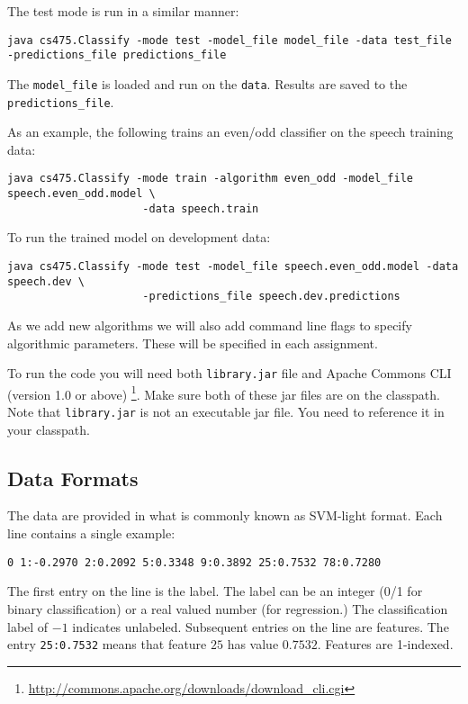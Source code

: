 \documentclass[11pt]{article}
\begin{document}
The test mode is run in a similar manner:
\begin{footnotesize}
\begin{verbatim}
java cs475.Classify -mode test -model_file model_file -data test_file -predictions_file predictions_file
\end{verbatim}
\end{footnotesize}
The {\tt model\_file} is loaded and run on the {\tt data}. Results are saved to the {\tt predictions\_file}.

As an example, the following trains an even/odd classifier on the speech training data:
\begin{footnotesize}
\begin{verbatim}
java cs475.Classify -mode train -algorithm even_odd -model_file speech.even_odd.model \
                     -data speech.train
\end{verbatim}
\end{footnotesize}
To run the trained model on development data:
\begin{footnotesize}
\begin{verbatim}
java cs475.Classify -mode test -model_file speech.even_odd.model -data speech.dev \
                     -predictions_file speech.dev.predictions
\end{verbatim}
\end{footnotesize}

As we add new algorithms we will also add command line flags to specify algorithmic parameters. These will be specified in each assignment.

To run the code you will need both {\tt library.jar} file and Apache Commons CLI (version 1.0 or above) \footnote{\href{http://commons.apache.org/downloads/download_cli.cgi}{http://commons.apache.org/downloads/download\_cli.cgi}}. Make sure both of these jar files are on the classpath. Note that {\tt library.jar} is not an executable jar file. You need to reference it in your classpath.



\subsection{Data Formats}
The data are provided in what is commonly known as SVM-light format. Each line contains a single example:
\begin{footnotesize}
\begin{verbatim}
0 1:-0.2970 2:0.2092 5:0.3348 9:0.3892 25:0.7532 78:0.7280
\end{verbatim}
\end{footnotesize}
The first entry on the line is the label. The label can be an integer (0/1 for binary classification) or a real valued number (for regression.) The classification label of $-1$ indicates unlabeled. Subsequent entries on the line are features. The entry {\tt 25:0.7532} means that feature $25$ has value $0.7532$. Features are 1-indexed.
\end{document}
